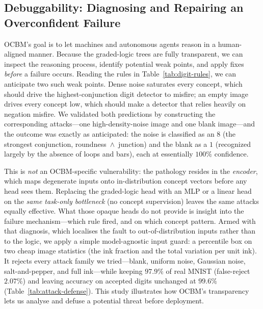 \subsection{Debuggability: Diagnosing and Repairing an Overconfident Failure}
\label{sec:debuggability}

OCBM's goal is to let machines and autonomous agents reason in a human-aligned
manner. Because the graded-logic trees are fully transparent, we can inspect the
reasoning process, identify potential weak points, and apply fixes \emph{before}
a failure occurs. Reading the rules in Table~\ref{tab:digit-rules}, we can
anticipate two such weak points. Dense noise saturates every concept, which
should drive the highest-conjunction digit detector to misfire; an empty image
drives every concept low, which should make a detector that relies heavily on
negation misfire. We validated both predictions by constructing the
corresponding attacks---one high-density-noise image and one blank image---and
the outcome was exactly as anticipated: the noise is classified as an
\textbf{$8$} (the strongest conjunction, roundness~$\wedge$~junction) and the
blank as a \textbf{$1$} (recognized largely by the absence of loops and bars),
each at essentially $100\%$ confidence.

This is \emph{not} an OCBM-specific vulnerability: the pathology resides in the
\emph{encoder}, which maps degenerate inputs onto in-distribution concept vectors
before any head sees them. Replacing the graded-logic head with an MLP or a
linear head on the \emph{same task-only bottleneck} (no concept supervision)
leaves the same attacks equally effective. What
those opaque heads do not provide is insight into the failure mechanism---which
rule fired, and on which concept pattern. Armed with that diagnosis, which
localises the fault to out-of-distribution inputs rather than to the logic, we
apply a simple model-agnostic input guard: a percentile box on two cheap image
statistics (the ink fraction and the total variation per unit ink). It rejects
every attack family we tried---blank, uniform noise, Gaussian noise,
salt-and-pepper, and full ink---while keeping $97.9\%$ of real MNIST
(false-reject $2.07\%$) and leaving accuracy on accepted digits unchanged at
$99.6\%$ (Table~\ref{tab:attack-defense}). This study illustrates how OCBM's
transparency lets us analyse and defuse a potential threat before deployment.

